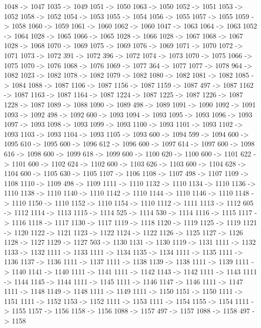 {	1048 -> 1047
	1035 -> 1049
	1051 -> 1050
	1063 -> 1050
	1052 -> 1051
	1053 -> 1052
	1058 -> 1052
	1054 -> 1053
	1055 -> 1054
	1056 -> 1055
	1057 -> 1055
	1059 -> 1058
	1060 -> 1059
	1061 -> 1060
	1062 -> 1060
	1047 -> 1063
	1064 -> 1063
	1052 -> 1064
	1028 -> 1065
	1066 -> 1065
	1028 -> 1066
	1028 -> 1067
	1068 -> 1067
	1028 -> 1068
	1070 -> 1069
	1075 -> 1069
	1076 -> 1069
	1071 -> 1070
	1072 -> 1071
	1073 -> 1072
	391 -> 1072
	396 -> 1072
	1074 -> 1073
	1070 -> 1075
	1066 -> 1075
	1070 -> 1076
	1068 -> 1076
	1069 -> 1077
	364 -> 1077
	1077 -> 1078
	964 -> 1082
	1023 -> 1082
	1078 -> 1082
	1079 -> 1082
	1080 -> 1082
	1081 -> 1082
	1085 -> 1084
	1088 -> 1087
	1106 -> 1087
	1156 -> 1087
	1159 -> 1087
	497 -> 1087
	1162 -> 1087
	1163 -> 1087
	1164 -> 1087
	1224 -> 1087
	1225 -> 1087
	1226 -> 1087
	1228 -> 1087
	1089 -> 1088
	1090 -> 1089
	498 -> 1089
	1091 -> 1090
	1092 -> 1091
	1093 -> 1092
	498 -> 1092
	600 -> 1093
	1094 -> 1093
	1095 -> 1093
	1096 -> 1093
	1097 -> 1093
	1098 -> 1093
	1099 -> 1093
	1100 -> 1093
	1101 -> 1093
	1102 -> 1093
	1103 -> 1093
	1104 -> 1093
	1105 -> 1093
	600 -> 1094
	599 -> 1094
	600 -> 1095
	610 -> 1095
	600 -> 1096
	612 -> 1096
	600 -> 1097
	614 -> 1097
	600 -> 1098
	616 -> 1098
	600 -> 1099
	618 -> 1099
	600 -> 1100
	620 -> 1100
	600 -> 1101
	622 -> 1101
	600 -> 1102
	624 -> 1102
	600 -> 1103
	626 -> 1103
	600 -> 1104
	628 -> 1104
	600 -> 1105
	630 -> 1105
	1107 -> 1106
	1108 -> 1107
	498 -> 1107
	1109 -> 1108
	1110 -> 1109
	498 -> 1109
	1111 -> 1110
	1132 -> 1110
	1134 -> 1110
	1136 -> 1110
	1138 -> 1110
	1140 -> 1110
	1142 -> 1110
	1144 -> 1110
	1146 -> 1110
	1148 -> 1110
	1150 -> 1110
	1152 -> 1110
	1154 -> 1110
	1112 -> 1111
	1113 -> 1112
	605 -> 1112
	1114 -> 1113
	1115 -> 1114
	525 -> 1114
	530 -> 1114
	1116 -> 1115
	1117 -> 1116
	1118 -> 1117
	1130 -> 1117
	1119 -> 1118
	1120 -> 1119
	1125 -> 1119
	1121 -> 1120
	1122 -> 1121
	1123 -> 1122
	1124 -> 1122
	1126 -> 1125
	1127 -> 1126
	1128 -> 1127
	1129 -> 1127
	503 -> 1130
	1131 -> 1130
	1119 -> 1131
	1111 -> 1132
	1133 -> 1132
	1111 -> 1133
	1111 -> 1134
	1135 -> 1134
	1111 -> 1135
	1111 -> 1136
	1137 -> 1136
	1111 -> 1137
	1111 -> 1138
	1139 -> 1138
	1111 -> 1139
	1111 -> 1140
	1141 -> 1140
	1111 -> 1141
	1111 -> 1142
	1143 -> 1142
	1111 -> 1143
	1111 -> 1144
	1145 -> 1144
	1111 -> 1145
	1111 -> 1146
	1147 -> 1146
	1111 -> 1147
	1111 -> 1148
	1149 -> 1148
	1111 -> 1149
	1111 -> 1150
	1151 -> 1150
	1111 -> 1151
	1111 -> 1152
	1153 -> 1152
	1111 -> 1153
	1111 -> 1154
	1155 -> 1154
	1111 -> 1155
	1157 -> 1156
	1158 -> 1156
	1088 -> 1157
	497 -> 1157
	1088 -> 1158
	497 -> 1158
}
